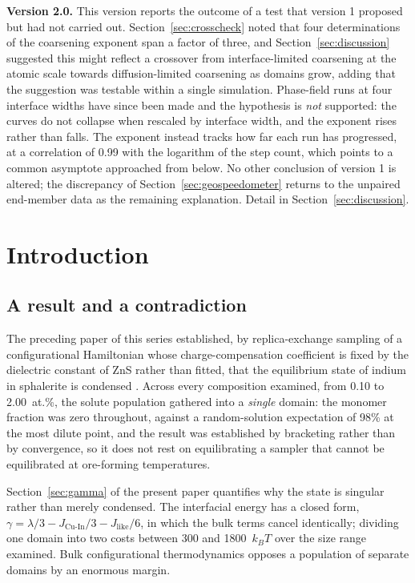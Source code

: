 \documentclass[preprint,12pt,authoryear]{elsarticle}
\newcommand{\JCuIn}{J_{\mathrm{Cu\text{-}In}}}
\newcommand{\Jlike}{J_{\mathrm{like}}}
\begin{document}
\noindent\small
\textbf{Version 2.0.} This version reports the outcome of a test that version 1
proposed but had not carried out. Section~\ref{sec:crosscheck} noted that four
determinations of the coarsening exponent span a factor of three, and
Section~\ref{sec:discussion} suggested this might reflect a crossover from
interface-limited coarsening at the atomic scale towards diffusion-limited
coarsening as domains grow, adding that the suggestion was testable within a
single simulation. Phase-field runs at four interface widths have since been
made and the hypothesis is \emph{not} supported: the curves do not collapse
when rescaled by interface width, and the exponent rises rather than falls. The
exponent instead tracks how far each run has progressed, at a correlation of
0.99 with the logarithm of the step count, which points to a common asymptote
approached from below. No other conclusion of version 1 is altered; the
discrepancy of Section~\ref{sec:geospeedometer} returns to the unpaired
end-member data as the remaining explanation. Detail in
Section~\ref{sec:discussion}.
\normalsize

\linenumbers


\section{Introduction}
\label{sec:intro}

\subsection{A result and a contradiction}

The preceding paper of this series established, by replica-exchange sampling of
a configurational Hamiltonian whose charge-compensation coefficient is fixed by
the dielectric constant of ZnS rather than fitted, that the equilibrium state of
indium in sphalerite is condensed \citep{yu2026b}. Across every composition
examined, from 0.10 to 2.00~at.\%, the solute population gathered into a
\emph{single} domain: the monomer fraction was zero throughout, against a
random-solution expectation of 98\% at the most dilute point, and the result was
established by bracketing rather than by convergence, so it does not rest on
equilibrating a sampler that cannot be equilibrated at ore-forming temperatures.

Section~\ref{sec:gamma} of the present paper quantifies why the state is
singular rather than merely condensed. The interfacial energy has a closed form,
$\gamma = \lambda/3 - \JCuIn/3 - \Jlike/6$, in which the bulk terms cancel
identically; dividing one domain into two costs between 300 and 1800~$k_BT$ over
the size range examined. Bulk configurational thermodynamics opposes a
population of separate domains by an enormous margin.
\end{document}
